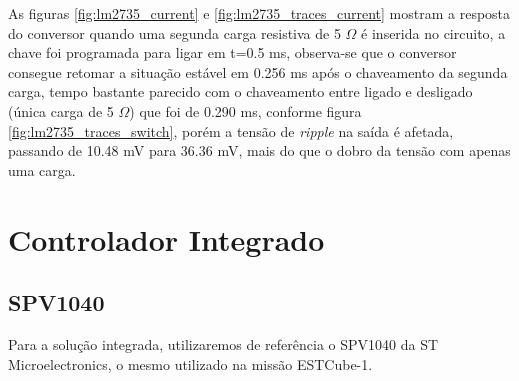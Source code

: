 \noindent
\begin{minipage}{\linewidth}
\label{fig:lm2735_traces_current}
\end{minipage}

As figuras \ref{fig:lm2735_current} e \ref{fig:lm2735_traces_current} mostram a resposta do conversor quando uma segunda carga resistiva de 5 $\Omega$ é inserida no circuito, a chave foi programada para ligar em t=0.5 ms, observa-se que o conversor consegue retomar a situação estável em 0.256 ms após o chaveamento da segunda carga, tempo bastante parecido com o chaveamento entre ligado e desligado (única carga de 5 $\Omega$) que foi de 0.290 ms, conforme figura \ref{fig:lm2735_traces_switch}, porém a tensão de \textit{ripple} na saída é afetada, passando de 10.48 mV para 36.36 mV, mais do que o dobro da tensão com apenas uma carga.


\section{Controlador Integrado}

\subsection*{SPV1040}

Para a solução integrada, utilizaremos de referência o SPV1040 \cite{spv1040_datasheet} da ST Microelectronics, o mesmo utilizado na missão ESTCube-1. 


